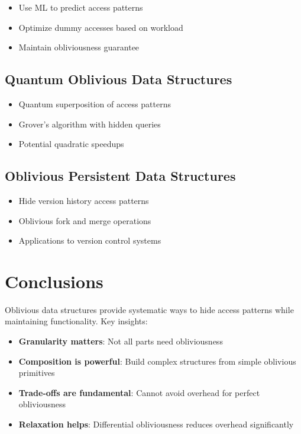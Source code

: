 \documentclass[11pt,final,hidelinks]{article}
\begin{document}
\begin{itemize}
    \item Use ML to predict access patterns
    \item Optimize dummy accesses based on workload
    \item Maintain obliviousness guarantee
\end{itemize}

\subsection{Quantum Oblivious Data Structures}

\begin{itemize}
    \item Quantum superposition of access patterns
    \item Grover's algorithm with hidden queries
    \item Potential quadratic speedups
\end{itemize}

\subsection{Oblivious Persistent Data Structures}

\begin{itemize}
    \item Hide version history access patterns
    \item Oblivious fork and merge operations
    \item Applications to version control systems
\end{itemize}

\section{Conclusions}

Oblivious data structures provide systematic ways to hide access patterns while maintaining functionality. Key insights:

\begin{itemize}
    \item \textbf{Granularity matters}: Not all parts need obliviousness
    \item \textbf{Composition is powerful}: Build complex structures from simple oblivious primitives
    \item \textbf{Trade-offs are fundamental}: Cannot avoid overhead for perfect obliviousness
    \item \textbf{Relaxation helps}: Differential obliviousness reduces overhead significantly
\end{itemize}
\end{document}
